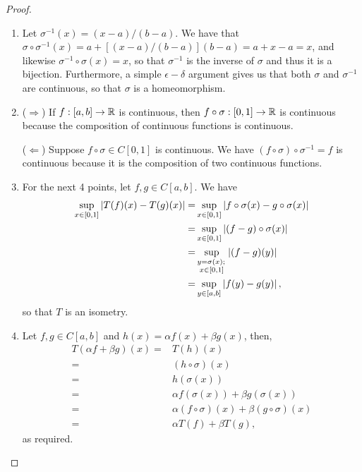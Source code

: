 \begin{proof}
\begin{enumerate}
    \item Let $\sigma^{-1}(x) = (x-a)/(b-a)$.
    We have that $\sigma \circ \sigma^{-1} (x) = a + [(x-a)/(b-a)](b-a) = a + x - a = x$, and likewise $\sigma^{-1}\circ\sigma(x) = x$, so that $\sigma^{-1}$ is the inverse of $\sigma$ and thus it is a bijection.
    Furthermore, a simple $\epsilon-\delta$ argument gives us that both $\sigma$ and $\sigma^{-1}$ are continuous, so that $\sigma$ is a homeomorphism.
    \item 
    ($\Rightarrow$)
    If $f:[a,b]\to\mathbb{R}$ is continuous, then $f\circ \sigma:[0,1]\to\mathbb{R}$ is continuous because the composition of continuous functions is continuous.

    ($\Leftarrow$)
    Suppose $f\circ\sigma \in C[0,1]$ is continuous.
    We have $(f\circ\sigma)\circ\sigma^{-1}=f$ is continuous because it is the composition of two continuous functions.

    \item 
    For the next 4 points, let $f,g\in C[a,b]$.
    We have 
    \begin{align*}
    \sup_{x\in[0,1]}\left\lvert T(f)(x)-T(g)(x)\right\rvert 
    =& \sup_{x\in[0,1]}\left\lvert f\circ\sigma(x) - g\circ\sigma(x)\right\rvert\\
    =& \sup_{x\in[0,1]}\left\lvert (f-g)\circ\sigma(x)\right\rvert\\
    =& \sup_{\substack{y=\sigma(x);\,\\ x\in[0,1]}}\left\lvert (f-g)(y)\right\rvert\\
    =& \sup_{y\in[a,b]}\left\lvert f(y)-g(y)\right\rvert,
    \end{align*}
    so that $T$ is an isometry.
    
    \item 
    Let  $f,g \in C[a,b]$ and $h(x) = \alpha f(x) + \beta g(x)$, then,
    \begin{align*}
        T(\alpha f + \beta g)(x)
        =& T(h)(x)\\
        =& (h\circ\sigma)(x)\\
        =& h(\sigma(x))\\
        =& \alpha f(\sigma(x)) + \beta g(\sigma(x))\\
        =& \alpha(f\circ\sigma)(x) 
            + \beta (g\circ\sigma)(x)\\
        =& \alpha T(f) + \beta T(g),
    \end{align*}
    as required.
    

\end{enumerate}
\end{proof}
